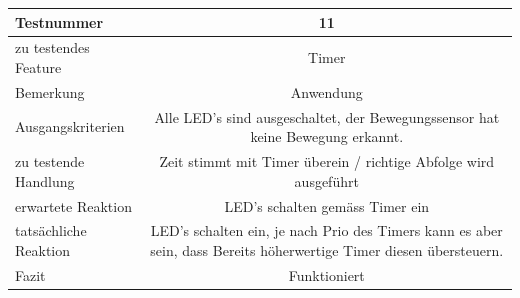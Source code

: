 \documentclass[]{article}
\begin{document}
\begin{longtable}[]{@{}lc@{}}
\toprule
\begin{minipage}[b]{0.25\columnwidth}\raggedright\strut
Testnummer\strut
\end{minipage} & \begin{minipage}[b]{0.55\columnwidth}\centering\strut
11\strut
\end{minipage}\tabularnewline
\midrule
\endhead
\begin{minipage}[t]{0.25\columnwidth}\raggedright\strut
zu testendes Feature\strut
\end{minipage} & \begin{minipage}[t]{0.55\columnwidth}\centering\strut
Timer\strut
\end{minipage}\tabularnewline
\begin{minipage}[t]{0.25\columnwidth}\raggedright\strut
Bemerkung\strut
\end{minipage} & \begin{minipage}[t]{0.55\columnwidth}\centering\strut
Anwendung\strut
\end{minipage}\tabularnewline
\begin{minipage}[t]{0.25\columnwidth}\raggedright\strut
Ausgangskriterien\strut
\end{minipage} & \begin{minipage}[t]{0.55\columnwidth}\centering\strut
Alle LED's sind ausgeschaltet, der Bewegungssensor hat keine Bewegung
erkannt.\strut
\end{minipage}\tabularnewline
\begin{minipage}[t]{0.25\columnwidth}\raggedright\strut
zu testende Handlung\strut
\end{minipage} & \begin{minipage}[t]{0.55\columnwidth}\centering\strut
Zeit stimmt mit Timer überein / richtige Abfolge wird ausgeführt\strut
\end{minipage}\tabularnewline
\begin{minipage}[t]{0.25\columnwidth}\raggedright\strut
erwartete Reaktion\strut
\end{minipage} & \begin{minipage}[t]{0.55\columnwidth}\centering\strut
LED's schalten gemäss Timer ein\strut
\end{minipage}\tabularnewline
\begin{minipage}[t]{0.25\columnwidth}\raggedright\strut
tatsächliche Reaktion\strut
\end{minipage} & \begin{minipage}[t]{0.55\columnwidth}\centering\strut
LED's schalten ein, je nach Prio des Timers kann es aber sein, dass
Bereits höherwertige Timer diesen übersteuern.\strut
\end{minipage}\tabularnewline
\begin{minipage}[t]{0.25\columnwidth}\raggedright\strut
Fazit\strut
\end{minipage} & \begin{minipage}[t]{0.55\columnwidth}\centering\strut
Funktioniert\strut
\end{minipage}\tabularnewline
\bottomrule
\end{longtable}
\end{document}
